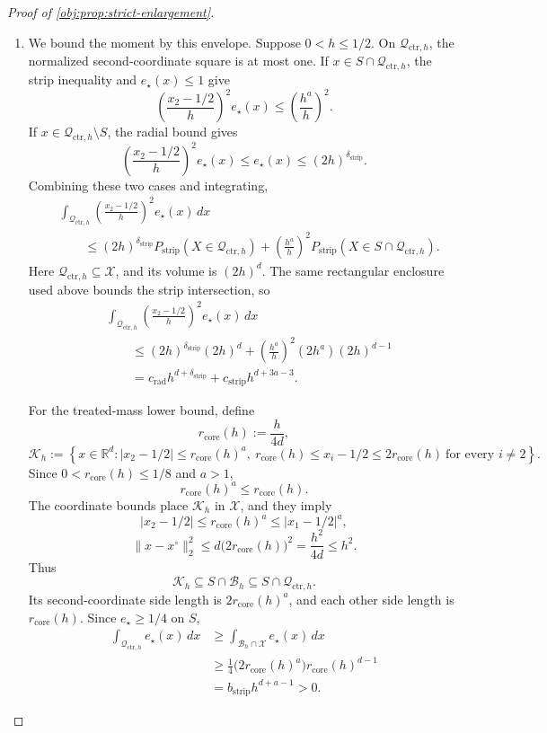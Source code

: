 \documentclass[11pt]{article}
\begin{document}
\begin{proof}[Proof of \cref{obj:prop:strict-enlargement}]
\begin{enumerate}
\item We bound the moment by this envelope. Suppose \(0<h\le1/2\). On \(\mathcal Q_{\mathrm{ctr},h}\), the normalized second-coordinate square is at most one. If \(x\in S\cap\mathcal Q_{\mathrm{ctr},h}\), the strip inequality and \(e_\star(x)\le1\) give
\[
\left(\frac{x_2-1/2}{h}\right)^2e_\star(x)
\le\left(\frac{h^a}{h}\right)^2.
\]
If \(x\in\mathcal Q_{\mathrm{ctr},h}\setminus S\), the radial bound gives
\[
\left(\frac{x_2-1/2}{h}\right)^2e_\star(x)
\le e_\star(x)\le(2h)^{\delta_{\mathrm{strip}}}.
\]
Combining these two cases and integrating,
\[
\begin{aligned}
&\int_{\mathcal Q_{\mathrm{ctr},h}}
\left(\frac{x_2-1/2}{h}\right)^2e_\star(x)\,dx\\
&\qquad\le
(2h)^{\delta_{\mathrm{strip}}}
P_{\mathrm{strip}}(X\in\mathcal Q_{\mathrm{ctr},h})
+
\left(\frac{h^a}{h}\right)^2
P_{\mathrm{strip}}(X\in S\cap\mathcal Q_{\mathrm{ctr},h}).
\end{aligned}
\]
Here \(\mathcal Q_{\mathrm{ctr},h}\subseteq\mathcal X\), and its volume is \((2h)^d\). The same rectangular enclosure used above bounds the strip intersection, so
\[
\begin{aligned}
&\int_{\mathcal Q_{\mathrm{ctr},h}}
\left(\frac{x_2-1/2}{h}\right)^2e_\star(x)\,dx\\
&\qquad\le
(2h)^{\delta_{\mathrm{strip}}}(2h)^d
+\left(\frac{h^a}{h}\right)^2(2h^a)(2h)^{d-1}\\
&\qquad=
c_{\mathrm{rad}}h^{d+\delta_{\mathrm{strip}}}
+c_{\mathrm{strip}}h^{d+3a-3}.
\end{aligned}
\]

For the treated-mass lower bound, define
\[
r_{\mathrm{core}}(h):=\frac{h}{4d},
\]
\[
\mathcal K_h
:=
\left\{
x\in\mathbb R^d:
|x_2-1/2|\le r_{\mathrm{core}}(h)^a,\
r_{\mathrm{core}}(h)\le x_i-1/2\le2r_{\mathrm{core}}(h)
\ \text{for every }i\ne2
\right\}.
\]
Since \(0<r_{\mathrm{core}}(h)\le1/8\) and \(a>1\),
\[
r_{\mathrm{core}}(h)^a\le r_{\mathrm{core}}(h).
\]
The coordinate bounds place \(\mathcal K_h\) in \(\mathcal X\), and they imply
\[
|x_2-1/2|
\le r_{\mathrm{core}}(h)^a
\le |x_1-1/2|^a,
\]
\[
\|x-x^\circ\|_2^2
\le d\bigl(2r_{\mathrm{core}}(h)\bigr)^2
=\frac{h^2}{4d}\le h^2.
\]
Thus
\[
\mathcal K_h\subseteq S\cap\mathcal B_h
\subseteq S\cap\mathcal Q_{\mathrm{ctr},h}.
\]
Its second-coordinate side length is \(2r_{\mathrm{core}}(h)^a\), and each other side length is \(r_{\mathrm{core}}(h)\). Since \(e_\star\ge1/4\) on \(S\),
\[
\begin{aligned}
\int_{\mathcal Q_{\mathrm{ctr},h}}e_\star(x)\,dx
&\ge\int_{\mathcal B_h\cap\mathcal X}e_\star(x)\,dx\\
&\ge\frac14
\bigl(2r_{\mathrm{core}}(h)^a\bigr)
r_{\mathrm{core}}(h)^{d-1}\\
&=b_{\mathrm{strip}}h^{d+a-1}>0.
\end{aligned}
\]


\end{enumerate}
\end{proof}
\end{document}
